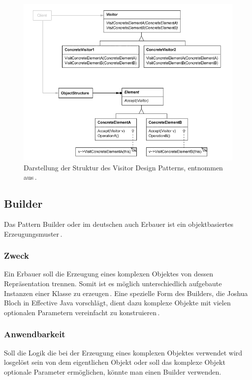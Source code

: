 \documentclass[12pt,oneside,a4paper,parskip]{scrbook}
\begin{document}
\begin{figure}[htbp]
	\centering
	\includegraphics[width=1.0\textwidth]{bilder/visitor}
	\caption{Darstellung der Struktur des Visitor Design Patterns, entnommen aus\,\cite[S. 485]{gamma2015}.}
	\label{fig:visitor}
\end{figure}

\subsection{Builder}

Das Pattern Builder oder im deutschen auch Erbauer ist ein objektbasiertes Erzeugungsmuster\,\cite[S. 159]{gamma2015}.

\subsubsection{Zweck}

Ein Erbauer soll die Erzeugung eines komplexen Objektes von dessen Repräsentation trennen. Somit ist es möglich unterschiedlich aufgebaute Instanzen einer Klasse zu erzeugen\,\cite[S. 159]{gamma2015}. Eine spezielle Form des Builders, die Joshua Bloch in Effective Java vorschlägt, dient dazu komplexe Objekte mit vielen optionalen Parametern vereinfacht zu konstruieren\,\cite[S. 10ff.]{bloch2017}. 

\subsubsection{Anwendbarkeit}

Soll die Logik die bei der Erzeugung eines komplexen Objektes verwendet wird losgelöst sein von dem eigentlichen Objekt oder soll das komplexe Objekt optionale Parameter ermöglichen, könnte man einen Builder verwenden.
\end{document}
